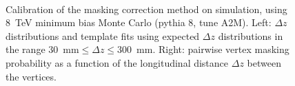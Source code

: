 \begin{enumerate}
\begin{figure}[htbp]
	\centering
	\\
	\caption{Calibration of the masking correction method on simulation, using 8~TeV minimum bias Monte Carlo (pythia 8, tune A2M). Left: $\Delta z$ distributions and template fits using expected $\Delta z$ distributions in the range $30$~mm$\leq\Delta z\leq300$~mm. Right: pairwise vertex masking probability as a function of the longitudinal distance $\Delta z$ between the vertices.}
	\label{fig:masking-correction-mc}
\end{figure}



\end{enumerate}
